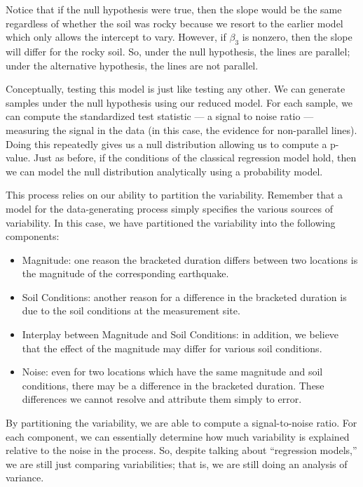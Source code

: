 \documentclass[
]{book}
\providecommand{\tightlist}{%
  \setlength{\itemsep}{0pt}\setlength{\parskip}{0pt}}
\theoremstyle{plain}
\theoremstyle{mydefn}
\theoremstyle{myexmpl}
\theoremstyle{remark}
\begin{document}
Notice that if the null hypothesis were true, then the slope would be the same regardless of whether the soil was rocky because we resort to the earlier model which only allows the intercept to vary. However, if \(\beta_3\) is nonzero, then the slope will differ for the rocky soil. So, under the null hypothesis, the lines are parallel; under the alternative hypothesis, the lines are not parallel.

Conceptually, testing this model is just like testing any other. We can generate samples under the null hypothesis using our reduced model. For each sample, we can compute the standardized test statistic --- a signal to noise ratio --- measuring the signal in the data (in this case, the evidence for non-parallel lines). Doing this repeatedly gives us a null distribution allowing us to compute a p-value. Just as before, if the conditions of the classical regression model hold, then we can model the null distribution analytically using a probability model.

This process relies on our ability to partition the variability. Remember that a model for the data-generating process simply specifies the various sources of variability. In this case, we have partitioned the variability into the following components:

\begin{itemize}
\tightlist
\item
  Magnitude: one reason the bracketed duration differs between two locations is the magnitude of the corresponding earthquake.
\item
  Soil Conditions: another reason for a difference in the bracketed duration is due to the soil conditions at the measurement site.
\item
  Interplay between Magnitude and Soil Conditions: in addition, we believe that the effect of the magnitude may differ for various soil conditions.
\item
  Noise: even for two locations which have the same magnitude and soil conditions, there may be a difference in the bracketed duration. These differences we cannot resolve and attribute them simply to error.
\end{itemize}

By partitioning the variability, we are able to compute a signal-to-noise ratio. For each component, we can essentially determine how much variability is explained relative to the noise in the process. So, despite talking about ``regression models,'' we are still just comparing variabilities; that is, we are still doing an analysis of variance.
\end{document}
